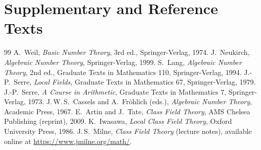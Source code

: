 \documentclass[11pt]{article}
\begin{document}
\section{Supplementary and Reference Texts}
\begin{thebibliography}{99}
 A.\ Weil, \emph{Basic Number Theory}, 3rd ed., Springer-Verlag, 1974.
 J.\ Neukirch, \emph{Algebraic Number Theory}, Springer-Verlag, 1999.
 S.\ Lang, \emph{Algebraic Number Theory}, 2nd ed., Graduate Texts in Mathematics 110, Springer-Verlag, 1994.
 J.-P.\ Serre, \emph{Local Fields}, Graduate Texts in Mathematics 67, Springer-Verlag, 1979.
 J.-P.\ Serre, \emph{A Course in Arithmetic}, Graduate Texts in Mathematics 7, Springer-Verlag, 1973.
 J.\,W.\,S.\ Cassels and A.\ Fr\"ohlich (eds.), \emph{Algebraic Number Theory}, Academic Press, 1967.
 E.\ Artin and J.\ Tate, \emph{Class Field Theory}, AMS Chelsea Publishing (reprint), 2009.
 K.\ Iwasawa, \emph{Local Class Field Theory}, Oxford University Press, 1986.
 J.\,S.\ Milne, \emph{Class Field Theory} (lecture notes), available online at \url{https://www.jmilne.org/math/}.
\end{thebibliography}
\end{document}
